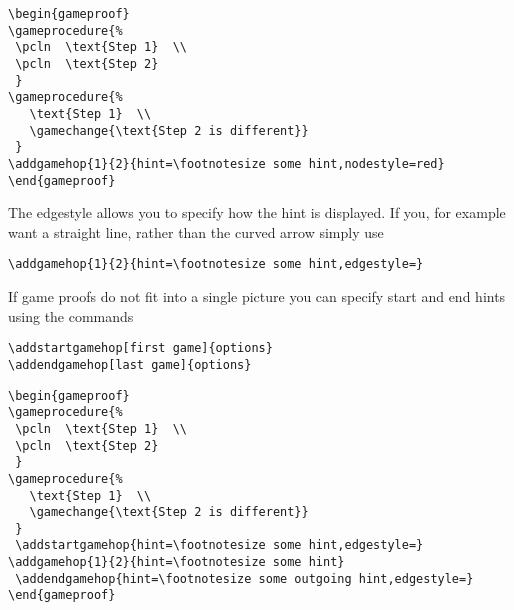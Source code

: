 \documentclass[a4paper]{report}
\begin{document}
\vspace{1ex}
\begin{center}
\begin{gameproof}
\end{gameproof}
\end{center}
\begin{lstlisting}
\begin{gameproof}
\gameprocedure{%
 \pcln  \text{Step 1}  \\
 \pcln  \text{Step 2}  
 }
\gameprocedure{%
   \text{Step 1}  \\
   \gamechange{\text{Step 2 is different}}  
 }
\addgamehop{1}{2}{hint=\footnotesize some hint,nodestyle=red}
\end{gameproof}
\end{lstlisting}
The edgestyle allows you to specify how the hint is displayed. If you, for example want a straight line, rather than the curved arrow simply
use 
\begin{lstlisting}
\addgamehop{1}{2}{hint=\footnotesize some hint,edgestyle=}
\end{lstlisting}



If game proofs do not fit into a single picture you can specify start and end hints using the commands
\begin{lstlisting}
\addstartgamehop[first game]{options}
\addendgamehop[last game]{options}
\end{lstlisting}

\begin{center}
\begin{gameproof}
\end{gameproof}
\end{center}


\begin{lstlisting}
\begin{gameproof}
\gameprocedure{%
 \pcln  \text{Step 1}  \\
 \pcln  \text{Step 2}  
 }
\gameprocedure{%
   \text{Step 1}  \\
   \gamechange{\text{Step 2 is different}}  
 }
 \addstartgamehop{hint=\footnotesize some hint,edgestyle=}
\addgamehop{1}{2}{hint=\footnotesize some hint}
 \addendgamehop{hint=\footnotesize some outgoing hint,edgestyle=}
\end{gameproof}
\end{lstlisting}
\end{document}
